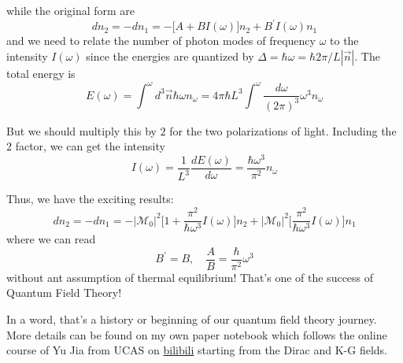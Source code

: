 \documentclass[12pt,openany]{book}
\begin{document}
	while the original form are 
	\begin{equation}
		dn_2=-dn_1=-\big[A+BI(\omega) \big]n_2+B^\prime I(\omega)n_1
	\end{equation}
	and we need to relate the number of photon modes of frequency $\omega$ to the intensity $I(\omega)$ since the energies
	are quantized by $\Delta=\hbar\omega=\hbar2\pi/L |\vec{n}|$. The total energy is
	\begin{equation}
		E(\omega)=\int^\omega d^3\vec{n}\hbar\omega n_\omega=4\pi\hbar L^3\int^\omega\frac{d\omega}{(2\pi)^3}\omega^3n_\omega
	\end{equation}\par 
	But we should multiply this by $2$ for the two polarizations of light. Including the $2$ factor, we can get the intensity
	\begin{equation}
		I(\omega)=\frac{1}{L^3}\frac{dE(\omega)}{d\omega}=\frac{\hbar\omega^3}{\pi^2}n_\omega
	\end{equation}\par 
	Thus, we have the exciting results:
	\begin{equation}
		dn_2=-dn_1=-|\mathcal{M}_0|^2\big[1+\frac{\pi^2}{\hbar\omega^3}I(\omega)\big]n_2+|\mathcal{M}_0|^2\big[\frac{\pi^2}{\hbar\omega^3}I(\omega)\big]n_1
	\end{equation}
	where we can read
	\begin{equation}
		B^\prime=B,\quad \frac{A}{B}=\frac{\hbar}{\pi^2}\omega^3
	\end{equation}
	without ant assumption of thermal equilibrium! That's one of the success of Quantum Field Theory!\par 
	In a word, that's a history or beginning of our quantum field theory journey. More details can be found on my own 
	paper notebook which follows the online course of Yu Jia from UCAS on \href{https://www.bilibili.com/video/BV1oo4y1o7RZ/?spm_id_from=333.1387.favlist.content.click}{bilibili} starting from the 
	Dirac and K-G fields.
	
	
	
	
	
	
	
	
	
	
	
	
	
	
	
	
\end{document}
